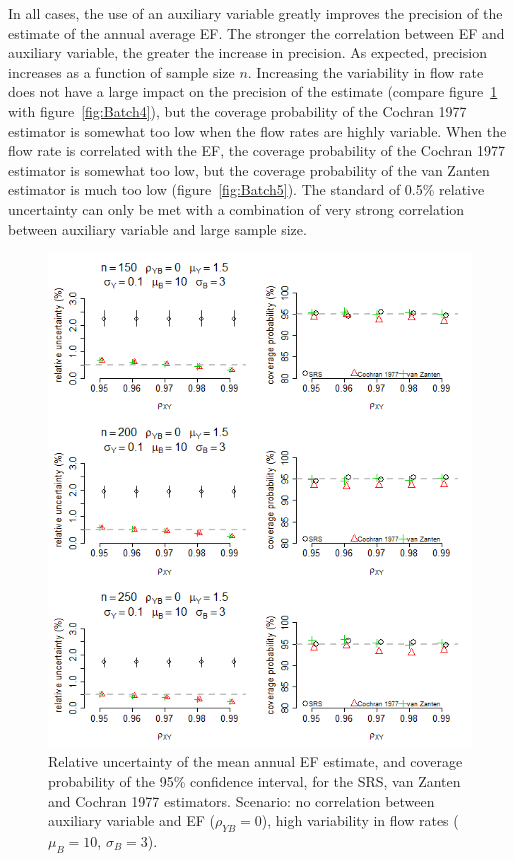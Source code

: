 In all cases, the use of an auxiliary variable greatly improves the precision of the estimate of the annual average EF. The stronger the correlation between EF and auxiliary variable, the greater the increase in precision. As expected, precision increases as a function of sample size $n$. Increasing the variability in flow rate does not have a large impact on the precision of the estimate (compare figure~\ref{fig:Batch3} with figure~\ref{fig:Batch4}), but the coverage probability of the Cochran 1977 estimator is somewhat too low when the flow rates are highly variable. When the flow rate is correlated with the EF, the coverage probability of the Cochran 1977 estimator is somewhat too low, but the coverage probability of the van Zanten estimator is much too low (figure~\ref{fig:Batch5}). The standard of 0.5\% relative uncertainty can only be met with a combination of very strong correlation between auxiliary variable and large sample size. 

\begin{figure}[h]
	\centering
	\includegraphics[width=\textwidth]{graphs/Results_Combined_withoutBoot_200.png}
	\caption{Relative uncertainty of the mean annual EF estimate, and coverage probability of the 95\% confidence interval, for the SRS, van Zanten and Cochran 1977 estimators. Scenario: no correlation between auxiliary variable and EF ($\rho_{YB}=0$), high variability in flow rates ($\mu_B=10$, $\sigma_B=3$). }
	\label{fig:Batch3}
\end{figure}

